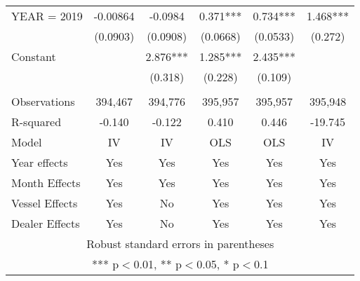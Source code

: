 \begin{tabular}{lccccc}
YEAR = 2019 & -0.00864 & -0.0984 & 0.371*** & 0.734*** & 1.468*** \\
 & (0.0903) & (0.0908) & (0.0668) & (0.0533) & (0.272) \\
Constant &  & 2.876*** & 1.285*** & 2.435*** &  \\
 &  & (0.318) & (0.228) & (0.109) &  \\
 &  &  &  &  &  \\
Observations & 394,467 & 394,776 & 395,957 & 395,957 & 395,948 \\
R-squared & -0.140 & -0.122 & 0.410 & 0.446 & -19.745 \\
Model & IV & IV & OLS & OLS & IV \\
Year effects & Yes & Yes & Yes & Yes & Yes \\
Month Effects & Yes & Yes & Yes & Yes & Yes \\
Vessel Effects & Yes & No & Yes & Yes & Yes \\
 Dealer Effects & Yes & No & Yes & Yes & Yes \\ \hline
\multicolumn{6}{c}{ Robust standard errors in parentheses} \\
\multicolumn{6}{c}{ *** p$<$0.01, ** p$<$0.05, * p$<$0.1} \\
\end{tabular}
